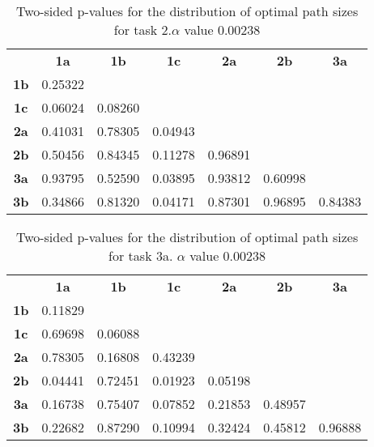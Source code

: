 \begin{table}[h!]
    \centering
    \begin{tabular}{ccccccc}
                & \textbf{1a}  & \textbf{1b}  & \textbf{1c}  & \textbf{2a}  & \textbf{2b}  & \textbf{3a}  \\
    \textbf{1b} & 0.25322 &         &         &         &         &         \\
    \textbf{1c} & 0.06024 & 0.08260 &         &         &         &         \\
    \textbf{2a} & 0.41031 & 0.78305 & 0.04943 &         &         &         \\
    \textbf{2b} & 0.50456 & 0.84345 & 0.11278 & 0.96891 &         &         \\
    \textbf{3a} & 0.93795 & 0.52590 & 0.03895 & 0.93812 & 0.60998 &         \\
    \textbf{3b} & 0.34866 & 0.81320 & 0.04171 & 0.87301 & 0.96895 & 0.84383
    \end{tabular}
    \caption[Experiment 2: p-table for path sizes (task 2)]{Two-sided p-values for the distribution of optimal path sizes for task 2.\(\alpha\) value 0.00238}
    \label{tab:exp2.pathsize2}
\end{table}

\newpage

\begin{table}[h!]
    \centering
    \begin{tabular}{ccccccc}
                & \textbf{1a}  & \textbf{1b}  & \textbf{1c}  & \textbf{2a}  & \textbf{2b}  & \textbf{3a}  \\
    \textbf{1b} & 0.11829 &         &         &         &         &         \\
    \textbf{1c} & 0.69698 & 0.06088 &         &         &         &         \\
    \textbf{2a} & 0.78305 & 0.16808 & 0.43239 &         &         &         \\
    \textbf{2b} & 0.04441 & 0.72451 & 0.01923 & 0.05198 &         &         \\
    \textbf{3a} & 0.16738 & 0.75407 & 0.07852 & 0.21853 & 0.48957 &         \\
    \textbf{3b} & 0.22682 & 0.87290 & 0.10994 & 0.32424 & 0.45812 & 0.96888
    \end{tabular}
    \caption[Experiment 2: p-table for path sizes (task 3a)]{Two-sided p-values for the distribution of optimal path sizes for task 3a. \(\alpha\) value 0.00238}
    \label{tab:exp2.pathsize3a}
\end{table}

